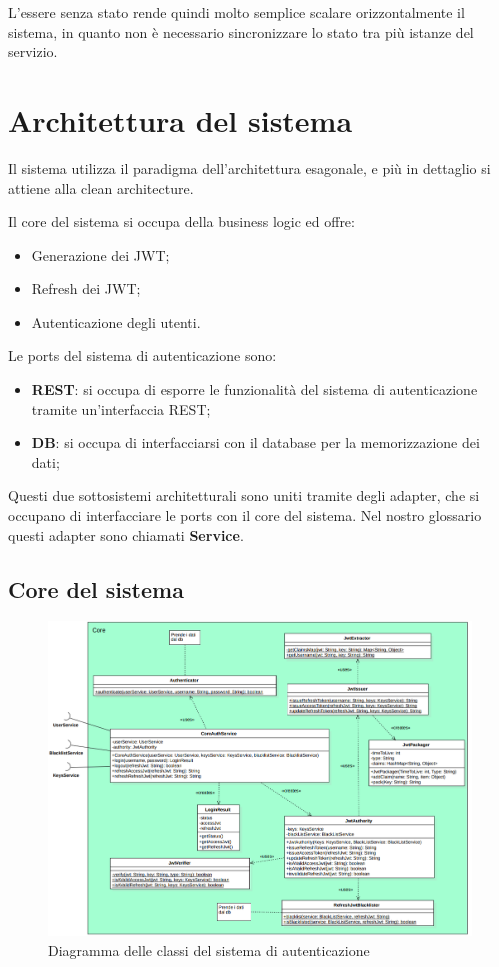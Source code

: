 L'essere senza stato rende quindi molto semplice scalare orizzontalmente il sistema, in quanto non è necessario sincronizzare lo stato tra più istanze del servizio.

\section{Architettura del sistema}

Il sistema utilizza il paradigma dell'architettura esagonale, e più in dettaglio si attiene alla clean architecture.

Il core del sistema si occupa della business logic ed offre:
\begin{itemize}
    \item Generazione dei JWT;
    \item Refresh dei JWT;
    \item Autenticazione degli utenti.
\end{itemize}

Le ports del sistema di autenticazione sono:
\begin{itemize}
    \item \textbf{REST}: si occupa di esporre le funzionalità del sistema di autenticazione tramite un'interfaccia REST;
    \item \textbf{DB}: si occupa di interfacciarsi con il database per la memorizzazione dei dati;
\end{itemize}

Questi due sottosistemi architetturali sono uniti tramite degli adapter, che si occupano di interfacciare le ports con il core del sistema. Nel nostro glossario questi adapter sono chiamati \textbf{Service}.

\subsection{Core del sistema}

\begin{figure}[h]
    \centering
    \includegraphics[width=\textwidth]{img/classi_auth.png}
    \caption{Diagramma delle classi del sistema di autenticazione}
\end{figure}

